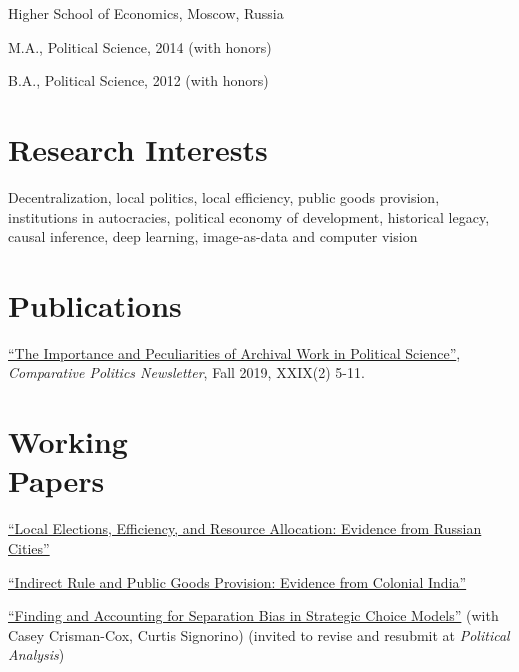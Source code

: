 \documentclass[margin,line,11pt]{res}
\newenvironment{list1}{
  \begin{list}{\ding{113}}{%
      \setlength{\itemsep}{0in}
      \setlength{\parsep}{0in} \setlength{\parskip}{0in}
      \setlength{\topsep}{0in} \setlength{\partopsep}{0in}
      \setlength{\leftmargin}{0.17in}}}{\end{list}}
\begin{document}
\begin{resume}
\vspace{-3mm}
{Higher School of Economics, Moscow, Russia}\\
\vspace*{-.1in}
\begin{list1}
 \item[] M.A., Political Science, 2014 (with honors) 
\item[] B.A., Political Science, 2012 (with honors)
\end{list1}

 \section{\sc Research Interests}
Decentralization, local politics, local efficiency, public goods provision,  institutions in autocracies, political economy of development, historical legacy, causal inference, deep learning, image-as-data and computer vision


\section{\sc Publications}

\href{https://www.comparativepoliticsnewsletter.org/wp-content/uploads/2019/12/CP-Newsletter-Fall-19-CP-and-History.pdf}{``The Importance and Peculiarities of Archival Work in Political Science''}, \emph{Comparative Politics Newsletter}, Fall 2019, XXIX(2) 5-11.


\section{\sc Working \\ Papers}
\href{https://olgasparyan.com/documents/jmp_feb.pdf}{``Local Elections, Efficiency, and Resource Allocation: Evidence from Russian Cities''}

\vspace*{-2.5mm}

\href{https://papers.ssrn.com/sol3/papers.cfm?abstract_id=3689339}{``Indirect Rule and Public Goods Provision: Evidence from Colonial India''} 


\vspace*{-2.5mm}
\href{https://www.dropbox.com/s/eabsdevozqwpdzg/SeparationProject.pdf?dl=0}{``Finding and Accounting for Separation Bias in Strategic Choice Models''} (with Casey Crisman-Cox, Curtis Signorino) (invited to revise and resubmit at \textit{Political Analysis})


\end{resume}
\end{document}
